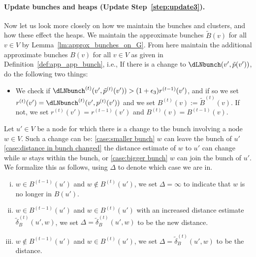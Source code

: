 \paragraph{Update bunches and heaps (Update Step~\ref{step:update3}).}
Now let us look more closely on how we maintain the bunches and clusters, and how these effect the heaps. We maintain the approximate bunches $\tilde B(v)$ for all $v\in V$ by Lemma~\ref{lm:approx_bunches_on_G}. From here maintain the additional approximate bunches $B(v)$ for all $v\in V$ as given in Definition~\ref{def:app_app_bunch}, i.e., 
If there is a change to $\dLNbunch(v',\tilde p(v'))$, do the following two things:\label{step:update_pivots}
    \begin{itemize}
        \item We check if $\dLNbunch^{(t)}(v',\tilde p^{(t)}(v'))> (1+\epsilon_3)r^{(t-1)}(v')$, and if so we set $r^{(t)}(v')=\dLNbunch^{(t)}(v',p^{(t)}(v'))$ and we set $B^{(t)}(v):=\tilde B^{(t)}(v)$. If not, we set $r^{(t)}(v')=r^{(t-1)}(v')$ and $B^{(t)}(v)=B^{(t-1)}(v)$.
    \end{itemize}
 Let $u'\in V$ be a node for which there is a change to the bunch involving a node $w\in V$. Such a change can be: \ref{case:smaller bunch} $w$ can leave the bunch of $u'$ \ref{case:distance in bunch changed} the distance estimate of $w$ to $u'$ can change while $w$ stays within the bunch, or \ref{case:bigger bunch} $w$ can join the bunch of $u'$. We formalize this as follows, using $\Delta$ to denote which case we are in.
    \begin{enumerate}[(i)]
        \item $w\in B^{(t-1)}(u')$ and $w\notin B^{(t)}(u')$, we set $\Delta=\infty$ to indicate that $w$ is no longer in $B(u')$. \label{case:smaller bunch}
        \item $w\in B^{(t-1)}(u')$ and $w\in B^{(t)}(u')$ with an increased distance estimate $\tilde \delta_B^{(t)}(u',w)$, we set $\Delta=\tilde \delta_B^{(t)}(u',w)$ to be the new distance. \label{case:distance in bunch changed}
        \item \label{case:bigger bunch} $w\notin B^{(t-1)}(u')$ and $w\in B^{(t)}(u')$, we set $\Delta=\tilde \delta_B^{(t)}(u',w)$ to be the distance. 
    \end{enumerate}
        
    
    
